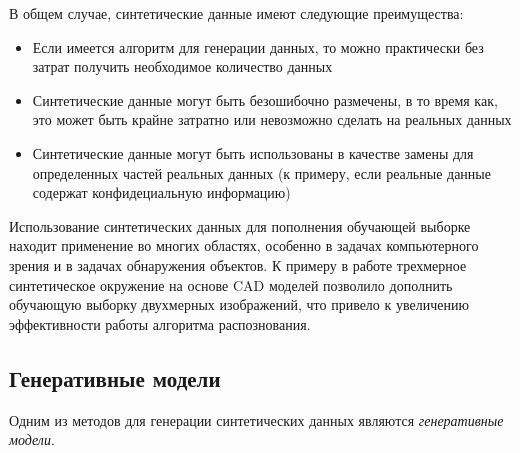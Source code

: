
В общем случае, синтетические данные имеют следующие преимущества:
\begin{itemize}
\item Если имеется алгоритм для генерации данных, то можно практически без затрат получить необходимое количество данных
\item Синтетические данные могут быть безошибочно размечены, в то время как, это может быть крайне затратно или невозможно сделать на реальных данных
\item Синтетические данные могут быть использованы в качестве замены для определенных частей реальных данных (к примеру, если реальные данные содержат конфидециальную информацию)

\end{itemize}

Использование синтетических данных для пополнения обучающей выборке находит применение во многих областях, особенно в задачах компьютерного зрения и в задачах обнаружения объектов. К примеру в работе \cite{peng-3d} трехмерное синтетическое окружение на основе CAD моделей позволило дополнить обучающую выборку двухмерных изображений, что привело к увеличению эффективности работы алгоритма распознования. 






\subsection{Генеративные модели}


Одним из методов для генерации синтетических данных являются \textit{генеративные модели}.

